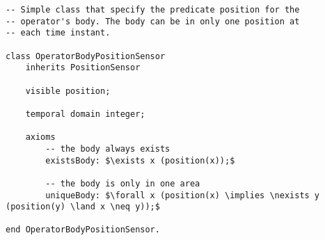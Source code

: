 \begin{lstlisting}[fontadjust, mathescape, frame=single] 
-- Simple class that specify the predicate position for the 
-- operator's body. The body can be in only one position at
-- each time instant.

class OperatorBodyPositionSensor
    inherits PositionSensor

    visible position;

    temporal domain integer;

    axioms
        -- the body always exists
        existsBody: $\exists x (position(x));$

        -- the body is only in one area
        uniqueBody: $\forall x (position(x) \implies \nexists y (position(y) \land x \neq y));$

end OperatorBodyPositionSensor.
\end{lstlisting}